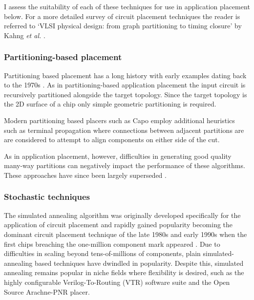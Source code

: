 			I assess the suitability of each of these techniques for use in
			application placement below. For a more detailed survey of circuit
			placement techniques the reader is referred to `VLSI physical design:
			from graph partitioning to timing closure' by Kahng \emph{et al.}
			\cite{kahng11}.
			
			\subsubsection{Partitioning-based placement}
				
				Partitioning based placement has a long history with early examples
				dating back to the 1970s \cite{breuer77}. As in partitioning-based
				application placement the input circuit is recursively partitioned
				alongside the target topology. Since the target topology is the 2D
				surface of a chip only simple geometric partitioning is required.
				
				Modern partitioning based placers such as Capo \cite{roy05} employ
				additional heuristics such as terminal propagation where connections
				between adjacent partitions are are considered to attempt to align
				components on either side of the cut.
				
				As in application placement, however, difficulties in generating good
				quality many-way partitions can negatively impact the performance of
				these algorithms. These approaches have since been largely superseded
				\cite{markov15}.
			
			\subsubsection{Stochastic techniques}
				
				The simulated annealing algorithm was originally developed specifically
				for the application of circuit placement \cite{kirkpatrick83} and
				rapidly gained popularity becoming the dominant circuit placement
				technique of the late 1980s and early 1990s when the first chips
				breaching the one-million component mark appeared
				\cite{betz97,sechen85}. Due to difficulties in scaling beyond
				tens-of-millions of components, plain simulated-annealing based
				techniques have dwindled in popularity. Despite this, simulated
				annealing remains popular in niche fields where flexibility is desired,
				such as the highly configurable Verilog-To-Routing (VTR) software suite
				\cite{luu14} and the Open Source Arachne-PNR \cite{cseed} placer.
				
